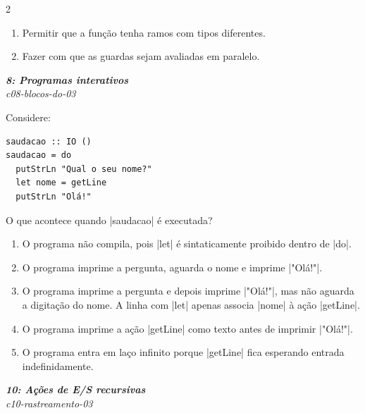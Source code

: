 \documentclass[a4paper,10pt,brazil]{article}
\begin{document}
\begin{multicols}{2}
\begin{enumerate}
  \item Permitir que a função tenha ramos com tipos diferentes.

  \item Fazer com que as guardas sejam avaliadas em paralelo.


\end{enumerate}

\begin{flushright}
  \footnotesize
  \textit{\textbf{8: Programas interativos}}\\
  \textit{c08-blocos-do-03}\\

\end{flushright}
Considere:

\begin{verbatim}
saudacao :: IO ()
saudacao = do
  putStrLn "Qual o seu nome?"
  let nome = getLine
  putStrLn "Olá!"
\end{verbatim}

O que acontece quando \haskellinline|saudacao| é executada?

\begin{enumerate}
  \item O programa não compila, pois \haskellinline|let| é sintaticamente proibido dentro de \haskellinline|do|.

  \item O programa imprime a pergunta, aguarda o nome e imprime \haskellinline|"Olá!"|.

  \item O programa imprime a pergunta e depois imprime \haskellinline|"Olá!"|, mas não aguarda a digitação do nome. A linha com \haskellinline|let| apenas associa \haskellinline|nome| à ação \haskellinline|getLine|.

  \item O programa imprime a ação \haskellinline|getLine| como texto antes de imprimir \haskellinline|"Olá!"|.

  \item O programa entra em laço infinito porque \haskellinline|getLine| fica esperando entrada indefinidamente.


\end{enumerate}

\begin{flushright}
  \footnotesize
  \textit{\textbf{10: Ações de E/S recursivas}}\\
  \textit{c10-rastreamento-03}\\


\end{flushright}
\end{multicols}
\end{document}
